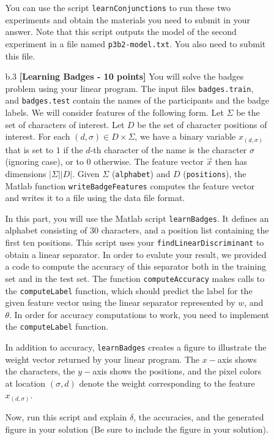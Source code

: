 \begin{enumerate}
\begin{enumerate}
\begin{enumerate}
      You can use the script {\tt learnConjunctions} to run these two 
      experiments and obtain the materials you need to submit in your answer.
      Note that this script outputs the model of the second experiment in a
      file named {\tt p3b2-model.txt}. You also need to submit this file. 
  
\item [b.3] \textbf{[Learning Badges - 10 points]} 
      You will solve the badges problem using your linear program.
      The input files {\tt badges.train}, and {\tt badges.test}
      contain
      the names of the participants and the badge labels.
      We will consider features of the following form.
      Let $\Sigma$ be the set of characters of interest.
      Let $D$ be the set of character positions of interest.
      For each $(d,\sigma) \in D \times \Sigma$, we have a binary variable
      $x_{(d,\sigma)}$ that is set to $1$ if the $d$-th character of the name is 
      the character $\sigma$ (ignoring case), or to $0$ otherwise.
      The feature vector $\vec{x}$ then has dimensions $|\Sigma||D|$.
      Given $\Sigma$ ({\tt alphabet}) and $D$ ({\tt positions}),
      the Matlab function {\tt writeBadgeFeatures} computes the feature vector
      and writes it to a file using the data file format.
      
      In this part, you will use the Matlab script {\tt learnBadges}.
      It defines an alphabet consisting of 30 characters, and 
      a position list containing the first ten positions.
      This script uses your {\tt findLinearDiscriminant} to obtain a linear separator.
      In order to evalute your result,
      we provided a code to compute the accuracy of this separator both in the training
      set and in the test set.
      The function {\tt computeAccuracy} makes calls to the {\tt computeLabel} function,
      which should predict the label for the given feature vector using the linear separator
      represented by $w$, and $\theta$.
      In order for accuracy computations to work,
      you need to implement the {\tt computeLabel} function.
      
      In addition to accuracy, {\tt learnBadges} creates a figure to illustrate the 
      weight vector returned by your linear program.
      The $x-$axis shows the characters, the $y-$axis shows the positions, and the 
      pixel colors at location $(\sigma,d)$ denote the weight corresponding to the feature $x_{(d,\sigma)}$.
      
      Now, run this script and explain $\delta$, the accuracies, and the generated figure
      in your solution (Be sure to include the figure in your solution). 
      

\end{enumerate}
\end{enumerate}
\end{enumerate}
